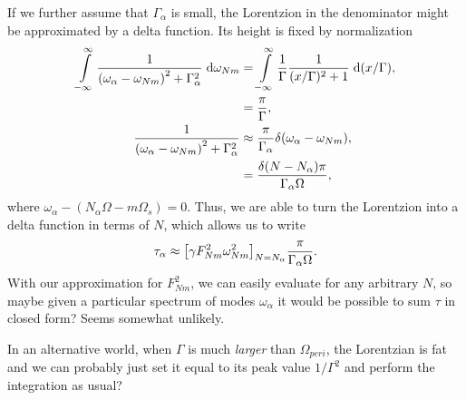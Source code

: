 \documentclass[11pt,
        usenames, %
        dvipsnames %
    ]{article}
\DeclarePairedDelimiter\p{\lparen}{\rparen}
\DeclarePairedDelimiter\s{\lbrack}{\rbrack}
\begin{document}
If we further assume that $\Gamma_{\alpha}$ is small, the Lorentzion in the
denominator might be approximated by a delta function. Its height is fixed by
normalization
\begin{align}
    \int\limits_{-\infty}^\infty \frac{1}{\p*{\omega_\alpha - \omega_{Nm}}^2
            + \Gamma_\alpha^2}\;\mathrm{d}\omega_{Nm}
        &= \int\limits_{-\infty}^\infty \frac{1}{\Gamma}
            \frac{1}{(x/\Gamma)^2 + 1}\;\mathrm{d}(x/\Gamma),\\
        &= \frac{\pi}{\Gamma},\\
    \frac{1}{\p*{\omega_\alpha - \omega_{Nm}}^2 + \Gamma_\alpha^2}
        &\approx \frac{\pi}{\Gamma_\alpha}\delta\p*{\omega_\alpha - \omega_{Nm}}
            ,\\
        &= \frac{\delta\p*{N - N_\alpha}\pi}{\Gamma_\alpha\Omega},
\end{align}
where $\omega_\alpha - (N_\alpha \Omega - m\Omega_s) = 0$. Thus, we are able to
turn the Lorentzion into a delta function in terms of $N$, which allows us to
write
\begin{equation}
    \tau_\alpha \approx \s*{\gamma F_{Nm}^2 \omega_{Nm}^2}_{N = N_\alpha}
        \frac{\pi}{\Gamma_\alpha \Omega}.
\end{equation}
With our approximation for $F_{Nm}^2$, we can easily evaluate for any arbitrary
$N$, so maybe given a particular spectrum of modes $\omega_\alpha$ it would be
possible to sum $\tau$ in closed form? Seems somewhat unlikely.

In an alternative world, when $\Gamma$ is much \emph{larger} than
$\Omega_{peri}$, the Lorentzian is fat and we can probably just set it equal to
its peak value $1/\Gamma^2$ and perform the integration as usual?
\end{document}
